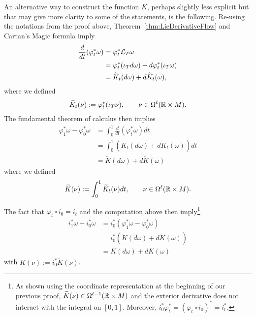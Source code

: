 \begin{remark}
	An alternative way to construct the function $K$, perhaps slightly less explicit but that may give more clarity to some of the statements, is the following.
	Re-using the notations from the proof above, Theorem~\ref{thm:LieDerivativeFlow} and Cartan's Magic formula imply
	\begin{align}
		\frac{d}{dt} (\varphi_t^*\omega) & = \varphi^*_t \mathcal{L}_T \omega                                        \\
		                                 & = \varphi_t^* ( \iota_T d\omega) + d \varphi_t^* (\iota_T \omega) \\
		                                 & = \widetilde K_t (d\omega) + d \widetilde K_t (\omega),
	\end{align}
	where we defined
	\begin{align}
		\widetilde K_t(\nu) := \varphi_t^* (\iota_T \nu),
		\qquad \nu \in \Omega^\ell(\mathbb{R}\times M).
	\end{align}
	The fundamental theorem of calculus then implies
	\begin{align}
		\varphi_1^* \omega - \varphi_0^* \omega & = \int_0^1 \frac{d}{dt} (\varphi_t^*\omega) dt                                 \\
		                                        & = \int_0^1 \left(\widetilde K_t (d\omega) + d \widetilde K_t(\omega)\right) dt \\
		                                        & = \widetilde K (d\omega) + d \widetilde K (\omega)
	\end{align}
	where we defined
	\begin{align}
		\widetilde K(\nu) := \int_0^1 \widetilde K_t (\nu) dt,
		\qquad \nu \in \Omega^\ell(\mathbb{R}\times M).
	\end{align}

	The fact that $\varphi_t \circ i_0 = i_t$ and the computation above then imply\footnote{As shown using the coordinate representation at the beginning of our previous proof, $\widetilde K(\nu) \in \Omega^{\ell-1}(\mathbb{R}\times M)$ and the exterior derivative does not interact with the integral on $[0,1]$. Moreover, $i_0^*\varphi_t^* = (\varphi_t\circ i_0)^* = i_t^*$.}
	\begin{align}
		i_1^* \omega - i_0^* \omega & = i_0^* (\varphi_1^* \omega - \varphi_0^* \omega)                     \\
		                            & = i_0^* \left(\widetilde K (d\omega) + d \widetilde K (\omega)\right) \\
		                            & = K(d \omega) + d K(\omega)
	\end{align}
	with $K(\nu) := i_0^* \widetilde K(\nu)$.
\end{remark}

